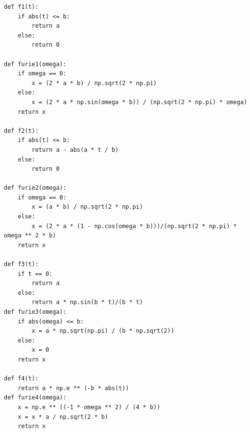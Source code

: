 \documentclass[a4paper, 12pt]{article}
\begin{document}
\begin{lstlisting}[caption={Остальные функции из 1 задания}]
def f1(t):
    if abs(t) <= b:
        return a
    else:
        return 0
    
def furie1(omega):
    if omega == 0:
        x = (2 * a * b) / np.sqrt(2 * np.pi)
    else:
        x = (2 * a * np.sin(omega * b)) / (np.sqrt(2 * np.pi) * omega)
    return x

def f2(t):
    if abs(t) <= b:
        return a - abs(a * t / b)
    else:
        return 0
    
def furie2(omega):
    if omega == 0:
        x = (a * b) / np.sqrt(2 * np.pi)
    else:
        x = (2 * a * (1 - np.cos(omega * b)))/(np.sqrt(2 * np.pi) * omega ** 2 * b)
    return x

def f3(t):
    if t == 0:
        return a
    else:
        return a * np.sin(b * t)/(b * t)
def furie3(omega):
    if abs(omega) <= b:
        x = a * np.sqrt(np.pi) / (b * np.sqrt(2))
    else:
        x = 0
    return x

def f4(t):
    return a * np.e ** (-b * abs(t))
def furie4(omega):
    x = np.e ** ((-1 * omega ** 2) / (4 * b))
    x = x * a / np.sqrt(2 * b)
    return x
\end{lstlisting}
\end{document}
